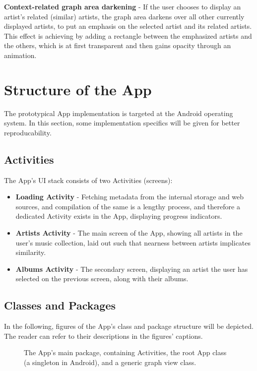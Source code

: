 \textbf{Context-related graph area darkening} - If the user chooses to display an artist's related (similar) artists, the graph area darkens over all other currently displayed artists, to put an emphasis on the selected artist and its related artists. This effect is achieving by adding a rectangle between the emphasized artists and the others, which is at first transparent and then gains opacity through an animation.

\section{Structure of the App}

The prototypical App implementation is targeted at the Android operating system. In this section, some implementation specifics will be given for better reproducability.

\subsection{Activities}

The App's UI stack consists of two Activities (screens):

\begin{itemize}
	\item \textbf{Loading Activity} - Fetching metadata from the internal storage and web sources, and compilation of the same is a lengthy process, and therefore a dedicated Activity exists in the App, displaying progress indicators.
	\item \textbf{Artists Activity} - The main screen of the App, showing all artists in the user's music collection, laid out such that nearness between artists implicates similarity.
	\item \textbf{Albums Activity} - The secondary screen, displaying an artist the user has selected on the previous screen, along with their albums.
\end{itemize}

\subsection{Classes and Packages}

In the following, figures of the App's class and package structure will be depicted. The reader can refer to their descriptions in the figures' captions.

\begin{figure}[H]
  \centering
  \caption{The App's main package, containing Activities, the root App class (a singleton in Android), and a generic graph view class.}
  \label{fig:package-main}
\end{figure}

